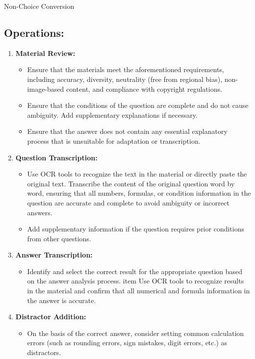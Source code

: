 \begin{methodbox}{Non-Choice Conversion}
\subsection*{Operations:}
\begin{enumerate}
    \item \textbf{Material Review:}
    \begin{itemize}
        \item Ensure that the materials meet the aforementioned requirements, including accuracy, diversity, neutrality (free from regional bias), non-image-based content, and compliance with copyright regulations.
        \item Ensure that the conditions of the question are complete and do not cause ambiguity. Add supplementary explanations if necessary.
        \item Ensure that the answer does not contain any essential explanatory process that is unsuitable for adaptation or transcription.
    \end{itemize}
    \item \textbf{Question Transcription:}
    \begin{itemize}
        \item Use OCR tools to recognize the text in the material or directly paste the original text. Transcribe the content of the original question word by word, ensuring that all numbers, formulas, or condition information in the question are accurate and complete to avoid ambiguity or incorrect answers.
        \item Add supplementary information if the question requires prior conditions from other questions.
    \end{itemize}
    \item \textbf{Answer Transcription:}
    \begin{itemize}
        \item Identify and select the correct result for the appropriate question based on the answer analysis process.
        item Use OCR tools to recognize results in the material and confirm that all numerical and formula information in the answer is accurate.
    \end{itemize}
    \item \textbf{Distractor Addition:}
    \begin{itemize}
        \item On the basis of the correct answer, consider setting common calculation errors (such as rounding errors, sign mistakes, digit errors, etc.) as distractors.

\end{itemize}
\end{enumerate}
\end{methodbox}
